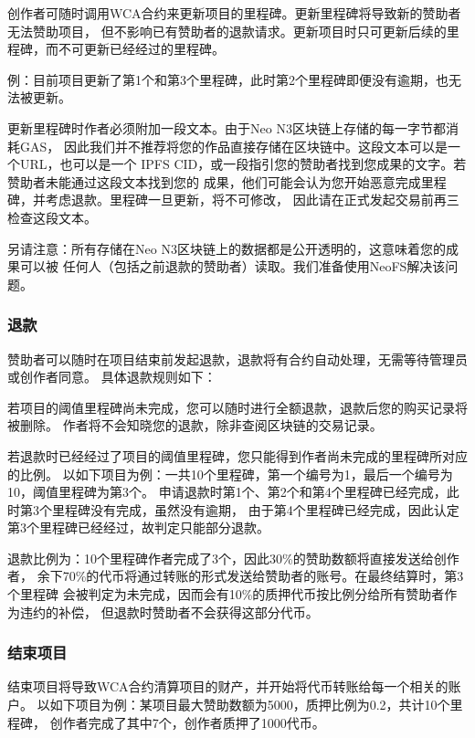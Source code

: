 \documentclass[11pt,UTF8,a4paper]{ctexart}
\begin{document}
    创作者可随时调用WCA合约来更新项目的里程碑。更新里程碑将导致新的赞助者无法赞助项目，
    但不影响已有赞助者的退款请求。更新项目时只可更新后续的里程碑，而不可更新已经经过的里程碑。

    例：目前项目更新了第1个和第3个里程碑，此时第2个里程碑即便没有逾期，也无法被更新。

    更新里程碑时作者必须附加一段文本。由于Neo N3区块链上存储的每一字节都消耗GAS，
    因此我们并不推荐将您的作品直接存储在区块链中。这段文本可以是一个URL，也可以是一个
    IPFS CID，或一段指引您的赞助者找到您成果的文字。若赞助者未能通过这段文本找到您的
    成果，他们可能会认为您开始恶意完成里程碑，并考虑退款。里程碑一旦更新，将不可修改，
    因此请在正式发起交易前再三检查这段文本。

    另请注意：所有存储在Neo N3区块链上的数据都是公开透明的，这意味着您的成果可以被
    任何人（包括之前退款的赞助者）读取。我们准备使用NeoFS解决该问题。

    \subsubsection{退款}

    赞助者可以随时在项目结束前发起退款，退款将有合约自动处理，无需等待管理员或创作者同意。
    具体退款规则如下：

    若项目的阈值里程碑尚未完成，您可以随时进行全额退款，退款后您的购买记录将被删除。
    作者将不会知晓您的退款，除非查阅区块链的交易记录。

    若退款时已经经过了项目的阈值里程碑，您只能得到作者尚未完成的里程碑所对应的比例。
    以如下项目为例：一共10个里程碑，第一个编号为1，最后一个编号为10，阈值里程碑为第3个。
    申请退款时第1个、第2个和第4个里程碑已经完成，此时第3个里程碑没有完成，虽然没有逾期，
    由于第4个里程碑已经完成，因此认定第3个里程碑已经经过，故判定只能部分退款。

    退款比例为：10个里程碑作者完成了3个，因此30\%的赞助数额将直接发送给创作者，
    余下70\%的代币将通过转账的形式发送给赞助者的账号。在最终结算时，第3个里程碑
    会被判定为未完成，因而会有10\%的质押代币按比例分给所有赞助者作为违约的补偿，
    但退款时赞助者不会获得这部分代币。

    \subsubsection{结束项目}

    结束项目将导致WCA合约清算项目的财产，并开始将代币转账给每一个相关的账户。
    以如下项目为例：某项目最大赞助数额为5000，质押比例为0.2，共计10个里程碑，
    创作者完成了其中7个，创作者质押了1000代币。
\end{document}
